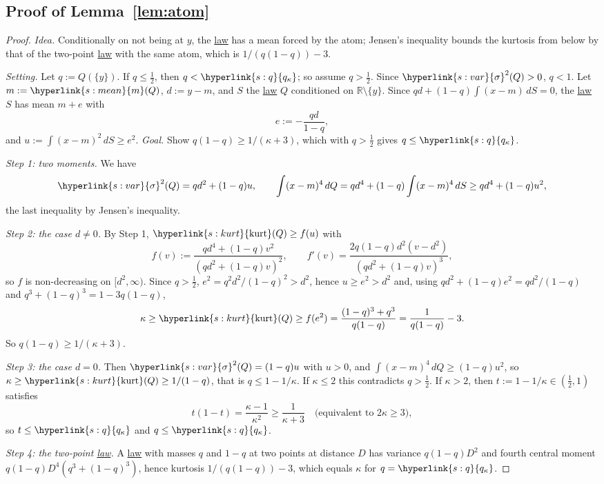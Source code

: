 \documentclass[11pt]{article}
\newcommand{\R}{\mathbb{R}}
\newcommand{\sy}[2]{{\hyperlink{#1}{#2}}}
\newcommand{\term}[2]{\hyperlink{#1}{#2}}
\newcommand{\mean}{\sy{s:mean}{m}}
\newcommand{\sd}{\sy{s:var}{\sigma}}
\newcommand{\kurt}{\sy{s:kurt}{\mathrm{kurt}}}
\newcommand{\qk}{\sy{s:q}{q_{\kappa}}}
\begin{document}
\subsection{Proof of Lemma~\ref{lem:atom}}\label{sec:proof-lem-atom}

\begin{proof}
\emph{Idea.} Conditionally on not being at $y$, the \term{w:law}{law} has a mean forced by the atom; Jensen's inequality
bounds the kurtosis from below by that of the two-point \term{w:law}{law} with the same atom, which is
$1/(q(1-q))-3$.

\emph{Setting.} Let $q:=Q(\{y\})$. If $q\le\frac12$, then $q<\qk$; so assume $q>\frac12$. Since $\sd^2(Q)>0$, $q<1$.
Let $m:=\mean(Q)$, $d:=y-m$, and $S$ the \term{w:law}{law} $Q$ conditioned on $\R\setminus\{y\}$. Since
$qd+(1-q)\int(x-m)\,dS=0$, the \term{w:law}{law} $S$ has mean $m+e$ with
\begin{equation*}
  e:=-\frac{qd}{1-q},
\end{equation*}
and $u:=\int(x-m)^2\,dS\ge e^2$. \emph{Goal.} Show $q(1-q)\ge1/(\kappa+3)$, which with $q>\frac12$ gives $q\le\qk$.

\emph{Step 1: two moments.} We have
\begin{equation*}
  \sd^2(Q)=qd^2+(1-q)u,\qquad \int(x-m)^4\,dQ=qd^4+(1-q)\int(x-m)^4\,dS\ge qd^4+(1-q)u^2,
\end{equation*}
the last inequality by Jensen's inequality.

\emph{Step 2: the case $d\neq0$.} By Step 1, $\kurt(Q)\ge f(u)$ with
\begin{equation*}
  f(v):=\frac{qd^4+(1-q)v^2}{(qd^2+(1-q)v)^2},\qquad f'(v)=\frac{2q(1-q)d^2(v-d^2)}{(qd^2+(1-q)v)^3},
\end{equation*}
so $f$ is non-decreasing on $[d^2,\infty)$. Since $q>\frac12$, $e^2=q^2d^2/(1-q)^2>d^2$, hence $u\ge e^2>d^2$ and,
using $qd^2+(1-q)e^2=qd^2/(1-q)$ and $q^3+(1-q)^3=1-3q(1-q)$,
\begin{equation*}
  \kappa\ge\kurt(Q)\ge f(e^2)=\frac{(1-q)^3+q^3}{q(1-q)}=\frac1{q(1-q)}-3 .
\end{equation*}
So $q(1-q)\ge1/(\kappa+3)$.

\emph{Step 3: the case $d=0$.} Then $\sd^2(Q)=(1-q)u$ with $u>0$, and $\int(x-m)^4\,dQ\ge(1-q)u^2$, so
$\kappa\ge\kurt(Q)\ge1/(1-q)$, that is $q\le1-1/\kappa$. If $\kappa\le2$ this contradicts $q>\frac12$. If $\kappa>2$, then
$t:=1-1/\kappa\in(\frac12,1)$ satisfies
\begin{equation*}
  t(1-t)=\frac{\kappa-1}{\kappa^2}\ge\frac1{\kappa+3}\quad\text{(equivalent to }2\kappa\ge3\text{)},
\end{equation*}
so $t\le\qk$ and $q\le\qk$.

\emph{Step 4: the two-point \term{w:law}{law}.} A \term{w:law}{law} with masses $q$ and $1-q$ at two points at distance $D$ has variance
$q(1-q)D^2$ and fourth central moment $q(1-q)D^4(q^3+(1-q)^3)$, hence kurtosis $1/(q(1-q))-3$, which equals
$\kappa$ for $q=\qk$.
\end{proof}
\end{document}
